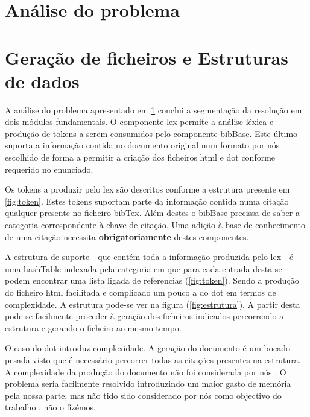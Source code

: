 \documentclass[a4paper]{article}
\begin{document}
\title{}
\author{Trabalho Prático nº 1\\ (Lex)}
\date{Ano lectivo 10/11}

\maketitle

\section{Análise do problema}
\label{sec:analise}
\section{Geração de ficheiros e Estruturas de dados}
A análise do problema apresentado em \ref{sec:analise} conclui a segmentação da resolução em dois módulos fundamentais. O componente lex permite a análise léxica e produção de tokens a serem consumidos pelo componente bibBase. Este último suporta a informação  contida no documento original num formato por nós escolhido de forma a permitir a criação dos ficheiros html e dot conforme requerido no enunciado.

Os tokens a produzir pelo lex são descritos conforme a estrutura presente em \ref{fig:token}. Estes tokens suportam  parte da informação contida numa citação qualquer presente no ficheiro bibTex. Além destes o bibBase  precissa de saber a  categoria correspondente à chave de citação. Uma adição à base de conhecimento de uma citação necessita \textbf{obrigatoriamente} destes componentes.


A estrutura de suporte - que contém toda a informação produzida pelo lex - é uma hashTable indexada pela categoria em que para cada entrada desta se podem encontrar uma lista ligada de referencias (\ref{fig:token}). Sendo a produção do ficheiro html facilitada e complicado um pouco a do dot em termos de complexidade. A estrutura pode-se ver na figura (\ref{fig:estrutura}).  A partir desta pode-se facilmente proceder à geração dos ficheiros indicados percorrendo a estrutura e gerando o ficheiro ao mesmo tempo. 

O caso do dot introduz complexidade. A geração do documento é um bocado pesada visto que é necessário percorrer todas as citações presentes na estrutura. A complexidade da produção do documento não foi considerada por nós . O problema seria facilmente resolvido introduzindo um maior gasto de memória pela nossa parte, mas não tido sido considerado por nós como objectivo do trabalho , não o fizémos. 
\end{document}
